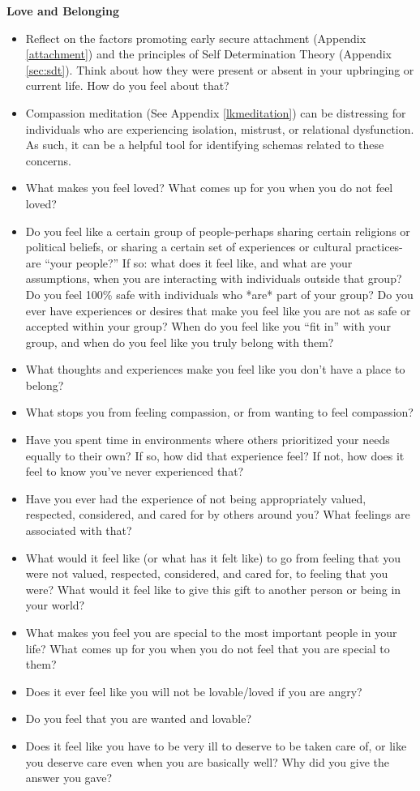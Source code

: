 \documentclass[12pt,letterpaper]{article}
\begin{document}
\noindent \textbf{Love and Belonging}
\begin{itemize}
    \item Reflect on the factors promoting early secure attachment (Appendix \ref{attachment}) and the principles of Self Determination Theory (Appendix \ref{sec:sdt}). Think about how they were present or absent in your upbringing or current life. How do you feel about that? 
    \item Compassion meditation (See Appendix \ref{lkmeditation}) can be distressing for individuals who are experiencing isolation, mistrust, or relational dysfunction. As such, it can be a helpful tool for identifying schemas related to these concerns.
    \item What makes you feel loved? What comes up for you when you do not feel loved?
    \item Do you feel like a certain group of people-perhaps sharing certain religions or political beliefs, or sharing a certain set of experiences or cultural practices-are “your people?”  If so: what does it feel like, and what are your assumptions, when you are interacting with individuals outside that group? Do you feel 100\% safe with individuals who *are* part of your group? Do you ever have experiences or desires that make you feel like you are not as safe or accepted within your group? When do you feel like you “fit in” with your group, and when do you feel like you truly belong with them?
    \item What thoughts and experiences make you feel like you don't have a place to belong?
    \item What stops you from feeling compassion, or from wanting to feel compassion?
    \item Have you spent time in environments where others prioritized your needs equally to their own? If so, how did that experience feel? If not, how does it feel to know you've never experienced that?
    \item Have you ever had the experience of not being appropriately valued, respected, considered, and cared for by others around you?  What feelings are associated with that?
    \item What would it feel like (or what has it felt like) to go from feeling that you were not valued, respected, considered, and cared for, to feeling that you were? What would it feel like to give this gift to another person or being in your world?
    \item What makes you feel you are special to the most important people in your life? What comes up for you when you do not feel that you are special to them?
    \item Does it ever feel like you will not be lovable/loved if you are angry?
    \item Do you feel that you are wanted and lovable?
    \item Does it feel like you have to be very ill to deserve to be taken care of, or like you deserve care even when you are basically well?  Why did you give the answer you gave?
\end{itemize}
\end{document}

